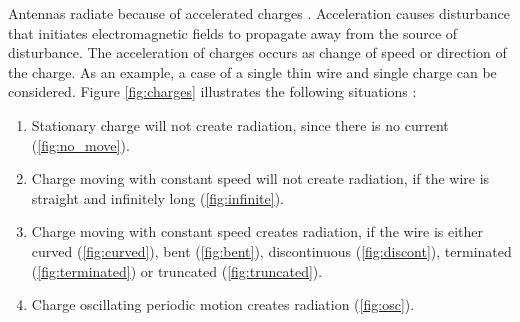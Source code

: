 Antennas radiate because of accelerated charges \cite{stutzman}. Acceleration causes disturbance that initiates electromagnetic fields to propagate away from the source of disturbance. The acceleration of charges occurs as change of speed or direction of the charge. As an example, a case of a single thin wire and single charge can be considered. Figure \ref{fig:charges} illustrates the following situations \cite{saunders, balanis}:
\begin{enumerate}
    \item Stationary charge will not create radiation, since there is no current (\ref{fig:no_move}).
    \item Charge moving with constant speed will not create radiation, if the wire is straight and infinitely long (\ref{fig:infinite}).
    \item Charge moving with constant speed creates radiation, if the wire is either curved (\ref{fig:curved}), bent (\ref{fig:bent}), discontinuous (\ref{fig:discont}), terminated (\ref{fig:terminated}) or truncated (\ref{fig:truncated}).
    \item Charge oscillating periodic motion creates radiation (\ref{fig:osc}).
\end{enumerate}

